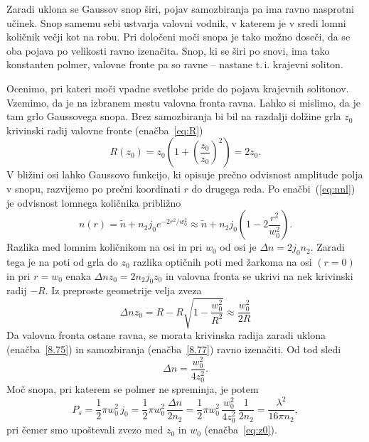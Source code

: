 Zaradi uklona se Gaussov snop širi, pojav samozbiranja pa ima ravno nasprotni
učinek. Snop samemu sebi ustvarja valovni vodnik, v katerem je v sredi lomni količnik 
večji kot na robu. Pri določeni moči snopa je tako možno doseči, da se oba pojava po
velikosti ravno izenačita. Snop, ki se širi po snovi, ima tako konstanten polmer, 
valovne fronte pa so ravne -- nastane t.\,i. krajevni soliton. 

Ocenimo, pri kateri moči vpadne svetlobe pride do pojava krajevnih solitonov. 
Vzemimo, da je na izbranem mestu valovna fronta ravna. Lahko si mislimo,
da je tam grlo Gaussovega snopa. Brez samozbiranja bi bil na razdalji
dolžine grla $z_{0}$ krivinski radij valovne fronte (enačba~\ref{eq:R})
\begin{equation}
R(z_{0})=z_{0}\left( 1+\left(\frac{z_{0}}{z_{0}}\right)^{2}\right)=2z_{0}.
\label{8.75}
\end{equation}
V bližini osi lahko Gaussovo funkcijo, ki opisuje prečno odvisnost
amplitude polja v snopu, razvijemo po prečni koordinati $r$ do drugega
reda. Po enačbi~(\ref{eq:nnl}) je odvisnost lomnega količnika približno
\begin{equation}
n(r)=\tilde{n}+n_2 j_0 e^{-2r^2/w_0^2} \approx \tilde{n}+n_2 j_0 \left(1 - 2\frac{r^2}{w_0^2}\right).
\label{8.76}
\end{equation}
Razlika med lomnim količnikom na osi in pri $w_{0}$ od osi je $\Delta n= 2j_{0} n_{2}$.
Zaradi tega je na poti od grla do $z_0$ razlika optičnih poti med žarkoma na osi $(r=0)$ in 
pri $r= w_{0}$ enaka $\Delta nz_{0} = 2 n_2 j_0 z_0$ in valovna fronta se 
ukrivi na nek krivinski radij $-R$. Iz preproste geometrije velja zveza 
\begin{equation}
\Delta nz_{0}=R-R\sqrt{1-\frac{w_{0}^{2}}{R^{2}}}\approx \frac{w_{0}^{2}}{2R}
\label{8.77}
\end{equation}
Da valovna fronta ostane ravna, se morata krivinska radija zaradi uklona 
(enačba~\ref{8.75}) in samozbiranja (enačba~\ref{8.77}) ravno izenačiti. 
Od tod sledi 
\begin{equation}
\Delta n=\frac{w_{0}^{2}}{4z_{0}^{2}}.
\label{8.78}
\end{equation}
Moč snopa, pri katerem se polmer ne spreminja, je potem 
\begin{equation}
P_{s}= \frac{1}{2}\pi w_0^2 \,j_0 = \frac{1}{2}\pi w_0^2 \, \frac{\Delta n}{2 n_2} = 
\frac{1}{2}\pi w_0^2 \,\frac{w_{0}^{2}}{4z_{0}^{2}}\,\frac{1}{2 n_2} = \frac{\lambda^2}{16 \pi n_2},
\label{8.79}
\end{equation}
pri čemer smo upoštevali zvezo med $z_0$ in $w_0$ (enačba~\ref{eq:z0}).

